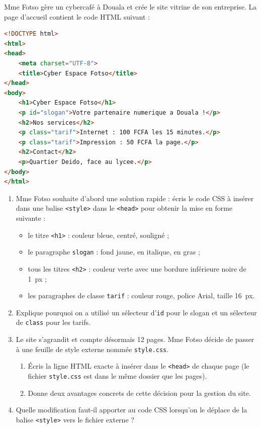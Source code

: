 \documentclass[11pt]{article}
\newcommand{\cle}[1]{{\popxbold\color{popdark}#1}}
\begin{document}
\begin{exercice}
Mme Fotso gère un cybercafé à Douala et crée le site vitrine de son entreprise. La page d'accueil contient le code \cle{HTML} suivant :
\begin{lstlisting}[language=HTML]
<!DOCTYPE html>
<html>
<head>
    <meta charset="UTF-8">
    <title>Cyber Espace Fotso</title>
</head>
<body>
    <h1>Cyber Espace Fotso</h1>
    <p id="slogan">Votre partenaire numerique a Douala !</p>
    <h2>Nos services</h2>
    <p class="tarif">Internet : 100 FCFA les 15 minutes.</p>
    <p class="tarif">Impression : 50 FCFA la page.</p>
    <h2>Contact</h2>
    <p>Quartier Deido, face au lycee.</p>
</body>
</html>
\end{lstlisting}
\begin{enumerate}
  \item Mme Fotso souhaite d'abord une solution rapide : écris le code \cle{CSS} à insérer dans une balise \texttt{<style>} dans le \texttt{<head>} pour obtenir la mise en forme suivante :
  \begin{itemize}
    \item le titre \texttt{<h1>} : couleur bleue, centré, souligné ;
    \item le paragraphe \texttt{slogan} : fond jaune, en italique, en gras ;
    \item tous les titres \texttt{<h2>} : couleur verte avec une bordure inférieure noire de \SI{1}{px} ;
    \item les paragraphes de classe \texttt{tarif} : couleur rouge, police Arial, taille \SI{16}{px}.
  \end{itemize}
  \item Explique pourquoi on a utilisé un sélecteur d'\texttt{id} pour le slogan et un sélecteur de \texttt{class} pour les tarifs.
  \item Le site s'agrandit et compte désormais 12 pages. Mme Fotso décide de passer à une feuille de style externe nommée \texttt{style.css}.
  \begin{enumerate}
    \item Écris la ligne \cle{HTML} exacte à insérer dans le \texttt{<head>} de chaque page (le fichier \texttt{style.css} est dans le même dossier que les pages).
    \item Donne deux avantages concrets de cette décision pour la gestion du site.
  \end{enumerate}
  \item Quelle modification faut-il apporter au code \cle{CSS} lorsqu'on le déplace de la balise \texttt{<style>} vers le fichier externe ?
\end{enumerate}
\end{exercice}
\end{document}
